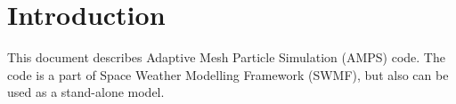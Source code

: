 
\chapter{Introduction}

This document describes Adaptive Mesh Particle Simulation (AMPS) code.
The code is a part of Space Weather Modelling Framework (SWMF), but also
can be used as a stand-alone model.
